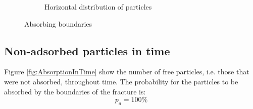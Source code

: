 \documentclass{article}
\begin{document}
\begin{figure}[htbp]
\begin{subfigure}[b]{0.45\textwidth}
        \caption{Horizontal distribution of particles}
        \label{fig:subplotHorFinal}
    \end{subfigure}
    \caption{Absorbing boundaries}
    \label{fig:Absorption}
\end{figure}

\FloatBarrier  %
\subsection{Non-adsorbed particles in time}
Figure \ref{fig:AbsorptionInTime} show the number of free particles, i.e. those that were not absorbed, throughout time. The probability for the particles to be absorbed by the boundaries of the fracture is:
\begin{equation}
    p_a = 100 \%
\end{equation}
\end{document}

